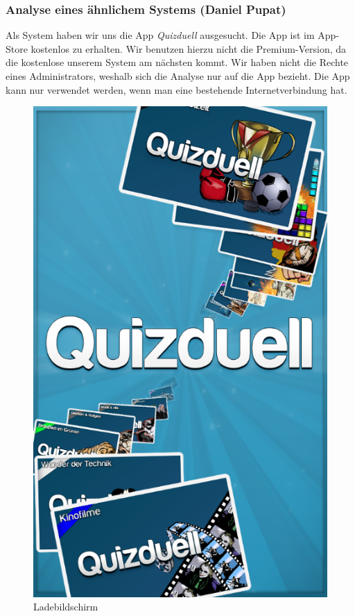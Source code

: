 \documentclass[fontsize=12pt,paper=a4,twoside]{scrartcl}
\begin{document}
\subsubsection{Analyse eines ähnlichem Systems (Daniel Pupat)}\label{quizduell}

Als System haben wir uns die App \textit{Quizduell} ausgesucht. Die App ist im App-Store kostenlos zu erhalten. Wir benutzen hierzu nicht die Premium-Version, da die kostenlose unserem System am nächsten kommt. Wir haben nicht die Rechte eines Administrators, weshalb sich die Analyse nur auf die App bezieht. Die App kann nur verwendet werden, wenn man eine bestehende Internetverbindung hat.\\

\begin{figure}[H]
\centering
\includegraphics[scale=0.5]{Bilder/lade.png}
\caption{Ladebildschirm}
\end{figure}
\end{document}

